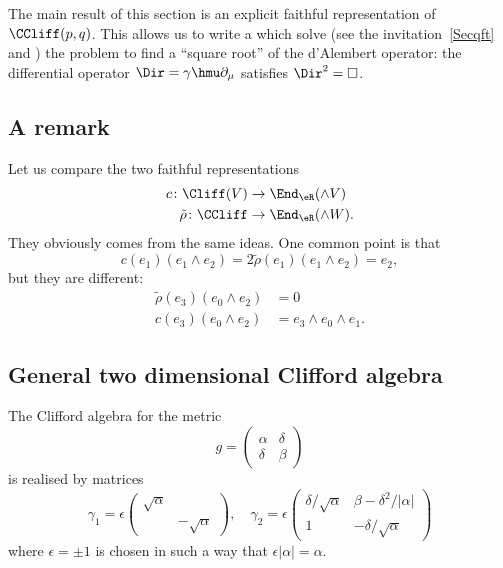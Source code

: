 The main result of this section is an explicit faithful representation of $\CCliff(p,q)$. This allows us to write a  which solve (see the invitation~\ref{Secqft} and \cite{Bronn}) the problem  to find a ``square root'' of the d'Alembert operator: the differential operator $\Dir=\gamma\hmu\partial_{\mu}$ satisfies $\Dir^2=\Box$.

\subsection{A remark}  %

Let us compare the two faithful representations
\[
	\begin{split}
		c\colon \Cliff(V)        & \to \End_{\eR}(\wedge V)   \\
		\tilde\rho\colon \CCliff & \to  \End_{\eR}(\wedge W).
	\end{split}
\]
They obviously comes from the same ideas. One common point is that
\[
	c(e_1)(e_1\wedge e_2)=2\tilde\rho (e_1)(e_1\wedge e_2)=e_2,
\]
but they are different:
\[
	\begin{split}
		\tilde\rho(e_3)(e_0\wedge e_2) & =0                        \\
		c(e_3)(e_0\wedge e_2)          & =e_3\wedge e_0\wedge e_1.
	\end{split}
\]

\subsection{General two dimensional Clifford algebra}

The Clifford algebra for the metric
\[
	g=\begin{pmatrix}
		\alpha & \delta \\\delta&\beta
	\end{pmatrix}
\]
is realised by matrices
\[
	\gamma_1=
	\epsilon\begin{pmatrix}
		\sqrt{\alpha} \\ & -\sqrt{\alpha}
	\end{pmatrix},\quad
	\gamma_2=
	\epsilon\begin{pmatrix}
		\delta/\sqrt{\alpha} & \beta-\delta^2/| \alpha | \\
		1                    & -\delta/\sqrt{\alpha}
	\end{pmatrix}
\]
where $\epsilon=\pm 1$ is chosen in such a way that $\epsilon| \alpha |=\alpha$.

